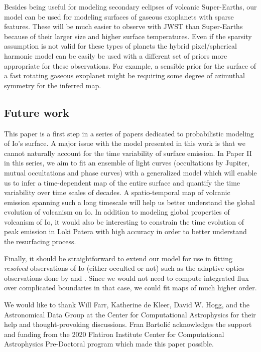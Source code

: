 \documentclass[linenumbers,modern]{aastex62}
\begin{document}
Besides being useful for modeling secondary eclipses of volcanic Super-Earths, our model can be used for modeling surfaces of gaseous exoplanets with sparse features.
These will be much easier to observe with JWST  than Super-Earths because of their larger size and higher surface temperatures.
Even if the sparsity assumption is not valid for these types of planets the hybrid pixel/spherical harmonic model can be easily be used with a different set of priors more appropriate for these observations.
For example, a sensible prior for the surface of a fast rotating gaseous exoplanet might be requiring some degree of azimuthal symmetry for the inferred map.

\subsection{Future work}
This paper is a first step in a series of papers dedicated to probabilistic modeling of Io's surface. 
A major issue with the model presented in this work is that we cannot naturally account for the time variability of surface emission.
In Paper II in this series, we aim to fit an ensemble of light curves (occultations by Jupiter, mutual occultations and phase curves) with a generalized model which will enable us to infer a time-dependent map of the entire surface and quantify the time variability over time scales of decades.
A spatio-temporal map of volcanic emission spanning such a long timescale will help us better understand the global evolution of volcanism on Io. 
In addition to modeling global properties of volcanism of Io, it would also be interesting to constrain the time evolution of peak emission in Loki Patera with high accuracy in order to better understand the resurfacing process.

Finally, it should be straightforward to extend our model for use in fitting \emph{resolved} observations of Io (either occulted or not) such as the adaptive optics observations done by \cite{dekleer2016a} and \cite{dekleer2016}.
Since we would not need to compute integrated flux over complicated boundaries in that case, we could fit maps of much higher order.

\vspace{+3em}

We would like to thank Will Farr, Katherine de Kleer, David W. Hogg, and the Astronomical Data Group at the Center for Computational Astrophysics for their help and thought-provoking discussions. Fran Bartoli\'c acknowledges the support and funding from the 2020 Flatiron Institute Center for Computational Astrophysics Pre-Doctoral program which made this paper possible.
\end{document}
